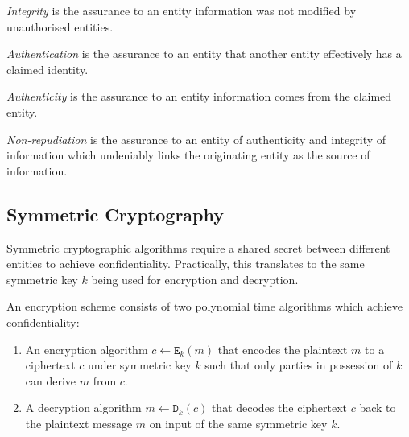 \begin{defn}[Integrity]
\label{def:integrity}
 \textit{Integrity} is the assurance to an entity information was not modified by unauthorised entities.
\end{defn}

\begin{defn}[Authentication]
\label{def:authentication}
 \textit{Authentication} is the assurance to an entity that another entity effectively has a claimed identity.
\end{defn}

\begin{defn}[Authenticity]
\label{def:authenticity}
 \textit{Authenticity} is the assurance to an entity information comes from the claimed entity.
\end{defn}

\begin{defn}
\label{def:non-repudiation}
 \textit{Non-repudiation} is the assurance to an entity of authenticity and integrity of information which undeniably links the originating entity as the source of information. 
\end{defn}

\subsection{Symmetric Cryptography}
Symmetric cryptographic algorithms require a shared secret between different entities to achieve confidentiality. Practically, this translates to the same symmetric key $k$ being used for encryption and decryption.

\begin{defn}
\label{def:encryption_scheme}
 An encryption scheme consists of two polynomial time algorithms which achieve confidentiality:
 \begin{enumerate}
   \item An encryption algorithm $c \leftarrow \mathtt{E}_k \left( m \right)$ that encodes the plaintext $m$ to a ciphertext $c$ under symmetric key $k$ such that only parties in possession of $k$ can derive $m$ from $c$.
   \item A decryption algorithm $m \leftarrow \mathtt{D}_k \left( c \right)$ that decodes the ciphertext $c$ back to the plaintext message $m$ on input of the same symmetric key $k$.
 \end{enumerate}
\end{defn}

